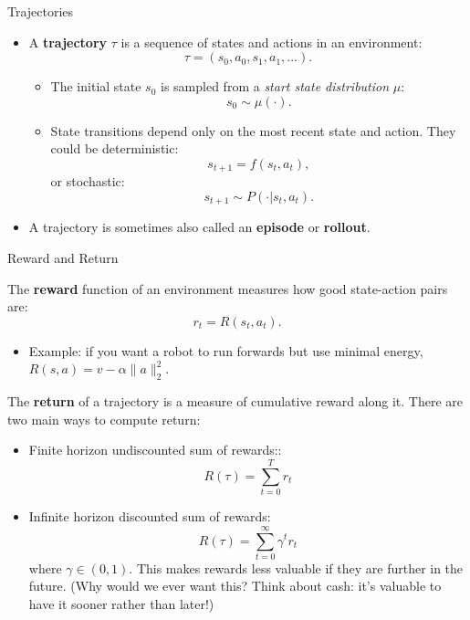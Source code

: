 \documentclass[9pt]{beamer}
\begin{document}
\begin{frame}{Trajectories}

\begin{itemize}
\item A \textbf{trajectory} $\tau$ is a sequence of states and actions in an environment:
\begin{equation*}
\tau = (s_0, a_0, s_1, a_1, ...).
\end{equation*}
\begin{itemize}
\item The initial state $s_0$ is sampled from a \textit{start state distribution} $\mu$:
%
\begin{equation*}
s_0 \sim \mu(\cdot).
\end{equation*}
\item State transitions depend only on the most recent state and action. They could be deterministic:
%
\begin{equation*}
s_{t+1} = f(s_t, a_t),
\end{equation*}
%
or stochastic:
%
\begin{equation*}
s_{t+1} \sim P(\cdot | s_t, a_t).
\end{equation*}
\end{itemize}
\item A trajectory is sometimes also called an \textbf{episode} or \textbf{rollout}. 
\end{itemize}

\end{frame}


\begin{frame}{Reward and Return}

The \textbf{reward} function of an environment measures how good state-action pairs are:
%
\begin{equation*}
r_t = R(s_t, a_t).
\end{equation*}

\begin{itemize}
\item Example: if you want a robot to run forwards but use minimal energy, $R(s, a) = v - \alpha \|a\|_2^2$. 
\end{itemize}
\pause
The \textbf{return} of a trajectory is a measure of cumulative reward along it. There are two main ways to compute return:
\begin{itemize}
\item Finite horizon undiscounted sum of rewards::
\begin{equation*}
R(\tau) = \sum_{t=0}^T r_t
\end{equation*}
\item Infinite horizon discounted sum of rewards:
\begin{equation*}
R(\tau) = \sum_{t=0}^{\infty} \gamma^t r_t
\end{equation*}
%
where $\gamma \in (0,1)$. This makes rewards less valuable if they are further in the future. (Why would we ever want this? Think about cash: it's valuable to have it sooner rather than later!)
\end{itemize}

\end{frame}
\end{document}
